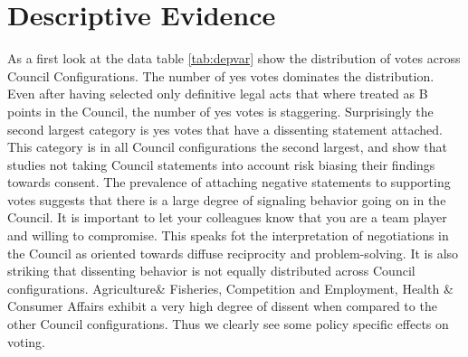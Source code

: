 \section{Descriptive Evidence}
As a first look at the data table \ref{tab:depvar} show the distribution of votes across Council Configurations. The number of yes votes dominates the distribution. Even after having selected only definitive legal acts that where treated as B points in the Council, the number of yes votes is staggering. Surprisingly the second largest category is yes votes that have a dissenting statement attached. This category is in all Council configurations the second largest, and show that studies not taking Council statements into account risk biasing their findings towards consent. The prevalence of attaching negative statements to supporting votes suggests that there is a large degree of signaling behavior going on in the Council. It is important to let your colleagues know that you are a team player and willing to compromise. This speaks fot the interpretation of negotiations in the Council as oriented towards diffuse reciprocity and problem-solving. It is also striking that dissenting behavior is not equally distributed across Council configurations. Agriculture\& Fisheries, Competition and Employment, Health \& Consumer Affairs exhibit a very high degree of dissent when compared to the other Council configurations. Thus we clearly see some policy specific effects on voting.


\begin{table*}[ht]
\begin{center}
\end{center}
\caption{The Distribution of Votes Across Council Configurations}
\label{tab:depvar}
\end{table*}

